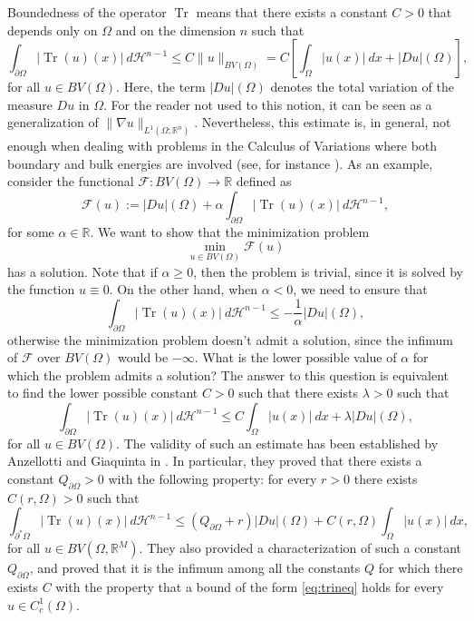 \documentclass[artcle, 11pt, reqno]{amsart}
\numberwithin{equation}{section}
\newcommand{\R}{\mathbb{R}}
\newcommand{\Hd}{\mathcal{H}}
\newcommand{\pom}{{\partial \Omega}}
\newcommand{\dd}{\: d}
\DeclareMathOperator{\Tr}{Tr}
\theoremstyle{plain}
\theoremstyle{definition}
\theoremstyle{remark}
\begin{document}
	Boundedness of the operator $\Tr$ means that there exists a constant $C>0$ that depends only on $\Omega$ and on the dimension $n$ such that
	\[
	\int_{\partial\Omega} |\Tr(u)(x)|\dd\Hd^{n-1} \leq C \|u\|_{BV(\Omega)}
	= C\left[ \int_\Omega |u(x)|\dd x + |Du|(\Omega) \right],
	\]
	for all $u \in BV(\Omega)$. Here, the term $|Du|(\Omega)$ denotes the total variation of the measure $Du$ in $\Omega$. For the reader not used to this notion, it can be seen as a generalization of $\|\nabla u\|_{L^1(\Omega;\R^n)}$.
	Nevertheless, this estimate is, in general, not enough when dealing with problems in the Calculus of Variations where both boundary and bulk energies are involved (see, for instance \cite{Modica, cristoferi2020relaxation}). As an example, consider the functional $\mathcal{F}: BV(\Omega)\to\R$ defined as
	\[
	\mathcal{F}(u) := |Du|(\Omega) + \alpha \int_{\partial\Omega} |\Tr(u)(x)|\dd\Hd^{n-1} ,
	\]
	for some $\alpha\in\R$. We want to show that the minimization problem
	\[
	\min_{u\in BV(\Omega)} \mathcal{F}(u)
	\]
	has a solution.
	Note that if $\alpha\geq0$, then the problem is trivial, since it is solved by the function $u\equiv0$. On the other hand, when $\alpha<0$, we need to ensure that
	\[
	\int_{\partial\Omega} |\Tr(u)(x)|\dd\Hd^{n-1} \leq -\frac{1}{\alpha}|Du|(\Omega),
	\]
	otherwise the minimization problem doesn't admit a solution, since the infimum of $\mathcal{F}$ over $BV(\Omega)$ would be $-\infty$. What is the lower possible value of $\alpha$ for which the problem admits a solution? The answer to this question is equivalent to find the lower possible constant $C>0$ such that there exists $\lambda>0$ such that
	\[
	\int_{\partial\Omega} |\Tr(u)(x)|\dd\Hd^{n-1}
	\leq C\int_\Omega |u(x)|\dd x + \lambda |Du|(\Omega),
	\]
	for all $u\in BV(\Omega)$.
	The validity of such an estimate has been established by Anzellotti and Giaquinta in \cite{anzellotti1978funzioni}.
	In particular, they proved that there exists a constant $Q_{\partial\Omega}>0$ with the following property: for every $r > 0$ there exists $C(r, \Omega) > 0$ such that
	\begin{equation} \label{eq:trineq}
		\int_{\partial^\ast \Omega} |\Tr(u)(x)|\dd\Hd^{n-1} \leq (Q_\pom + r)|D u|(\Omega) + C(r, \Omega)\int_\Omega |u(x)|\dd x,
	\end{equation}
	for all $u \in BV(\Omega, \R^M)$.
	They also provided a characterization of such a constant $Q_\pom$, and proved that it is the infimum among all the constants $Q$ for which there exists $C$ with the property that a bound of the form \eqref{eq:trineq} holds for every $u \in C^1_c(\Omega)$.
\end{document}
